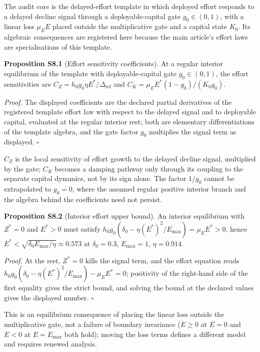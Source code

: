 \documentclass[
  10pt,
  a4paper,
]{article}
\begin{document}
The audit core is the delayed-effort template in which deployed effort
responds to a delayed decline signal through a deployable-capital gate
\(g_0 \in (0,1)\), with a linear loss \(\mu_E E\) placed outside the
multiplicative gate and a capital state \(K_0\). Its algebraic
consequences are registered here because the main article's effort laws
are specialisations of this template.

\textbf{Proposition S8.1} (Effort sensitivity coefficients). At a
regular interior equilibrium of the template with deployable-capital
gate \(g_0 \in (0,1)\), the effort sensitivities are
\(C_Z = h_0 g_0 \eta E^*/\Delta_{\mathrm{ref}}\) and
\(C_K = \mu_E E^*(1 - g_0)/(K_0 g_0)\).

\emph{Proof.} The displayed coefficients are the declared partial
derivatives of the registered template effort law with respect to the
delayed signal and to deployable capital, evaluated at the regular
interior rest; both are elementary differentiations of the template
algebra, and the gate factor \(g_0\) multiplies the signal term as
displayed. \(\square\)

\(C_Z\) is the local sensitivity of effort growth to the delayed decline
signal, multiplied by the gate; \(C_K\) becomes a damping pathway only
through its coupling to the separate capital dynamics, not by its sign
alone. The factor \(1/g_0\) cannot be extrapolated to \(g_0 = 0\), where
the assumed regular positive interior branch and the algebra behind the
coefficients need not persist.

\textbf{Proposition S8.2} (Interior effort upper bound). An interior
equilibrium with \(Z^* = 0\) and \(E^* > 0\) must satisfy
\(h_0 g_0(\delta_0 - \eta(E^*)^2/E_{\max}) = \mu_E E^* > 0\), hence
\(E^* < \sqrt{\delta_0 E_{\max}/\eta} \approx 0.573\) at
\(\delta_0 = 0.3\), \(E_{\max} = 1\), \(\eta = 0.914\).

\emph{Proof.} At the rest, \(Z^* = 0\) kills the signal term, and the
effort equation reads
\(h_0 g_0(\delta_0 - \eta(E^*)^2/E_{\max}) - \mu_E E^* = 0\); positivity
of the right-hand side of the first equality gives the strict bound, and
solving the bound at the declared values gives the displayed number.
\(\square\)

This is an equilibrium consequence of placing the linear loss outside
the multiplicative gate, not a failure of boundary invariance
(\(\dot E \ge 0\) at \(E = 0\) and \(\dot E < 0\) at \(E = E_{\max}\)
both hold); moving the loss terms defines a different model and requires
renewed analysis.
\end{document}
